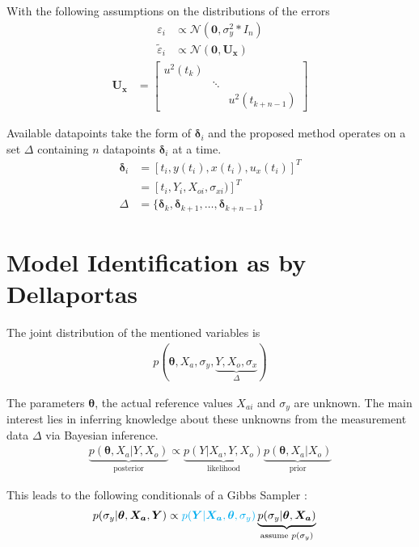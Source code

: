 \documentclass[10pt]{article}
\renewcommand{\vec}[1]{\boldsymbol{#1}}
\newcommand{\mat}[1]{\boldsymbol{#1}}
\begin{document}
With the following assumptions on the distributions of the errors
\begin{align}
    \varepsilon_i &\propto \mathcal{N}(\vec{0}, \sigma_y^2 * I_n)\\
    \tilde{\varepsilon}_i &\propto \mathcal{N}(\vec{0}, \mat{U_x}) 
\end{align}
\begin{align}
    \mat{U_x} &= \begin{bmatrix} u^2(t_k) && \\ &\ddots& \\ && u^2(t_{k+n-1}) \end{bmatrix} 
\end{align}

Available datapoints take the form of $\vec{\delta}_i$ and the proposed method operates on a set $\Delta$ containing $n$ datapoints $\vec{\delta}_i$ at a time.
\begin{align}
    \vec{\delta}_i &= [t_i, y(t_i), x(t_i), u_x(t_i)]^T \nonumber \\
                 &= [t_i, Y_i, X_{oi}, \sigma_{xi})]^T \\
    \Delta &= \{\vec{\delta}_k, \vec{\delta}_{k+1}, \dots,  \vec{\delta}_{k+n-1}\} 
\end{align}


\section{Model Identification as by Dellaportas}
The joint distribution of the mentioned variables is
\begin{align}
    p(\vec{\theta}, X_a, \sigma_y, \underbrace{Y, X_o, \sigma_x}_{\Delta})
\end{align}

The parameters $\vec{\theta}$, the actual reference values $X_{ai}$ and $\sigma_{y}$ are unknown.
The main interest lies in inferring knowledge about these unknowns from the measurement data $\Delta$ via Bayesian inference.
\begin{align}
    \underbrace{p(\vec{\theta}, X_a | Y, X_o)}_{\text{posterior}} \propto \underbrace{p(Y | X_a, Y, X_o)}_{\text{likelihood}} \underbrace{p(\vec{\theta}, X_a | X_o)}_{\text{prior}}
\end{align}

This leads to the following conditionals of a Gibbs Sampler \cite{dellaportas_1995}:
\begin{align}
    p(\sigma_y | \vec{\theta}, \vec{X_a}, \vec{Y}) &\propto {\color{cyan} p(\vec{Y} | \vec{X_a}, \vec{\theta}, \sigma_y)} \underbrace{p(\sigma_y | \vec{\theta}, \vec{X_a})}_{\text{assume } p(\sigma_y)} \label{eq:posterior_sigma_y}
\end{align}
\end{document}
